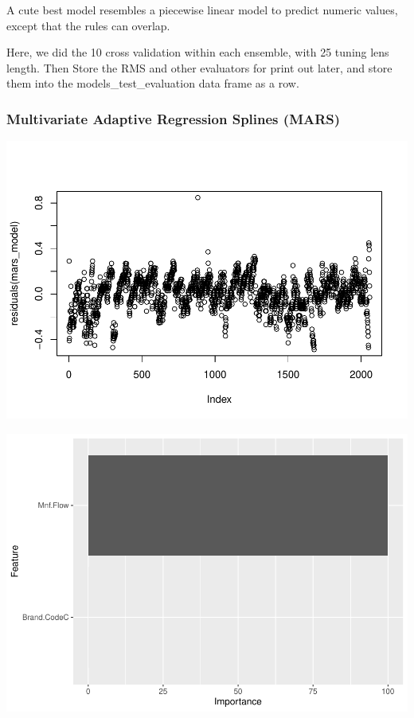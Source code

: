 \documentclass[]{article}
\begin{document}
A cute best model resembles a piecewise linear model to predict numeric
values, except that the rules can overlap.

Here, we did the 10 cross validation within each ensemble, with 25
tuning lens length. Then Store the RMS and other evaluators for print
out later, and store them into the models\_test\_evaluation data frame
as a row.

\subsubsection{Multivariate Adaptive Regression Splines
(MARS)}\label{multivariate-adaptive-regression-splines-mars}

\begin{center}\includegraphics{OmerOzeren_GracieHan_Project_2_files/figure-latex/unnamed-chunk-23-1} \end{center}

\begin{center}\includegraphics{OmerOzeren_GracieHan_Project_2_files/figure-latex/unnamed-chunk-23-2} \end{center}
\end{document}
